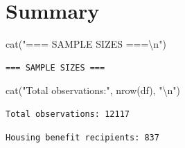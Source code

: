 \documentclass[
  letterpaper,
  DIV=11,
  numbers=noendperiod]{scrartcl}
\newenvironment{Shaded}{\begin{snugshade}}{\end{snugshade}}
\newcommand{\DecValTok}[1]{\textcolor[rgb]{0.68,0.00,0.00}{#1}}
\newcommand{\FunctionTok}[1]{\textcolor[rgb]{0.28,0.35,0.67}{#1}}
\newcommand{\NormalTok}[1]{\textcolor[rgb]{0.00,0.23,0.31}{#1}}
\newcommand{\SpecialCharTok}[1]{\textcolor[rgb]{0.37,0.37,0.37}{#1}}
\newcommand{\StringTok}[1]{\textcolor[rgb]{0.13,0.47,0.30}{#1}}
\begin{document}
\hypertarget{summary}{%
\section{Summary}\label{summary}}

\begin{Shaded}
\begin{Highlighting}[]
\FunctionTok{cat}\NormalTok{(}\StringTok{"=== SAMPLE SIZES ===}\SpecialCharTok{\textbackslash{}n}\StringTok{"}\NormalTok{)}
\end{Highlighting}
\end{Shaded}

\begin{verbatim}
=== SAMPLE SIZES ===
\end{verbatim}

\begin{Shaded}
\begin{Highlighting}[]
\FunctionTok{cat}\NormalTok{(}\StringTok{"Total observations:"}\NormalTok{, }\FunctionTok{nrow}\NormalTok{(df), }\StringTok{"}\SpecialCharTok{\textbackslash{}n}\StringTok{"}\NormalTok{)}
\end{Highlighting}
\end{Shaded}

\begin{verbatim}
Total observations: 12117 
\end{verbatim}

\begin{Shaded}
\end{Shaded}

\begin{verbatim}
Housing benefit recipients: 837 
\end{verbatim}

\begin{Shaded}
\end{Shaded}
\end{document}
